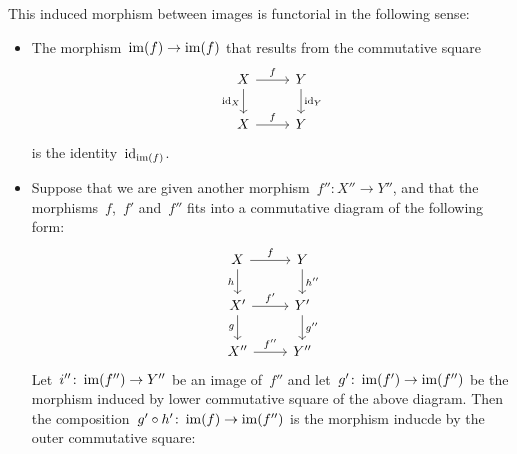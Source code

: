 \begin{remark*}
\begin{enumerate}
      This induced morphism between images is functorial in the following sense:
      \begin{itemize}
        \item
          The morphism~$\operatorname{im}(f) \to \operatorname{im}(f)$ that results from the commutative square
          \[
            \begin{tikzcd}
                X
                \arrow{r}[above]{f}
                \arrow{d}[left]{\id_X}
              & Y
                \arrow{d}[right]{\id_Y}
              \\
                X
                \arrow{r}[above]{f}
              & Y
            \end{tikzcd}
          \]
          is the identity~$\operatorname{id}_{\operatorname{im}(f)}$.
        \item
          Suppose that we are given another morphism~$f'' \colon X'' \to Y''$, and that the morphisms~$f$,~$f'$ and~$f''$ fits into a commutative diagram of the following form:
          \[
            \begin{tikzcd}
                X
                \arrow{r}[above]{f}
                \arrow{d}[left]{h}
              & Y
                \arrow{d}[right]{h''}
              \\
                X'
                \arrow{r}[above]{f'}
                \arrow{d}[left]{g}
              & Y'
                \arrow{d}[right]{g''}
              \\
                X''
                \arrow{r}[above]{f''}
              & Y''
            \end{tikzcd}
          \]
          Let~$i'' \colon \operatorname{im}(f'') \to Y''$ be an image of~$f''$ and let~$g' \colon \operatorname{im}(f') \to \operatorname{im}(f'')$ be the morphism induced by lower commutative square of the above diagram.
          Then the composition~$g' \circ h' \colon \operatorname{im}(f) \to \operatorname{im}(f'')$ is the morphism inducde by the outer commutative square:
          \[
            \begin{tikzcd}

\end{tikzcd}\]
\end{itemize}
\end{enumerate}
\end{remark*}
